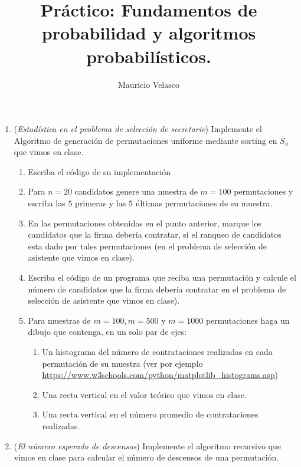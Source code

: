 \documentclass[12pt, a4paper]{article}
\date{}
\begin{document}
\title{Pr\'actico: Fundamentos de probabilidad y algoritmos probabilísticos.}
\author{Mauricio Velasco}
\maketitle{}


\begin{enumerate}

\item ({\it Estadística en el problema de selección de secretarie}) Implemente el Algoritmo de generación de permutaciones uniforme mediante sorting en $S_n$ que vimos en clase. 
\begin{enumerate}
\item Escriba el código de su implementación
\item Para $n=20$ candidatos genere una muestra de $m=100$ permutaciones y escriba las $5$ primeras y las $5$ últimas permutaciones de su muestra.
\item En las permutaciones obtenidas en el punto anterior, marque los candidatos que la firma debería contratar, si el ranqueo de candidatos esta dado por tales permutaciones (en el problema de selección de asistente que vimos en clase).
\item Escriba el código de un programa que reciba una permutación y calcule el número de candidatos que la firma debería contratar en el problema de selección de asistente que vimos en clase).
\item Para muestras de $m=100,m=500$ y $m=1000$ permutaciones haga un dibujo que contenga, en un solo par de ejes:
\begin{enumerate}
\item Un histograma del número de contrataciones  realizadas en cada permutación de su muestra (ver por ejemplo \url{https://www.w3schools.com/python/matplotlib_histograms.asp})
\item Una recta vertical en el valor teórico que vimos en clase.
\item Una recta vertical en el número promedio de contrataciones realizadas.
\end{enumerate}

\end{enumerate}


\item ({\it El número esperado de descensos}) Implemente el algoritmo recursivo que vimos en clase para calcular el número de descensos de una permutación.


\end{enumerate}
\end{document}
